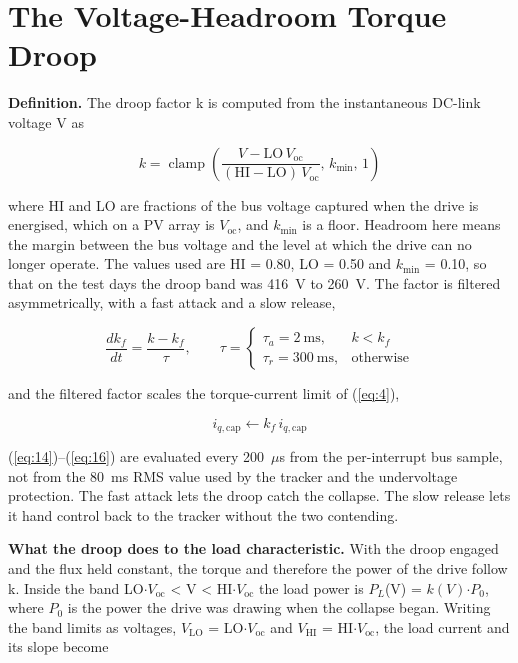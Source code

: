 \documentclass[journal]{IEEEtran}
\begin{document}
\section{The Voltage-Headroom Torque Droop}

\textbf{Definition.} The droop factor k is computed from the instantaneous DC-link voltage V as

\begin{equation}
k = \operatorname{clamp}\!\left(\frac{V - \mathrm{LO}\,V_{\mathrm{oc}}}{(\mathrm{HI}-\mathrm{LO})\,V_{\mathrm{oc}}},\, k_{\min},\, 1\right)
\label{eq:14}
\end{equation}

where HI and LO are fractions of the bus voltage captured when the drive is energised, which on a PV array is $V_{\mathrm{oc}}$, and $k_{\min}$ is a floor. Headroom here means the margin between the bus voltage and the level at which the drive can no longer operate. The values used are HI = 0.80, LO = 0.50 and $k_{\min}$ = 0.10, so that on the test days the droop band was 416~V to 260~V. The factor is filtered asymmetrically, with a fast attack and a slow release,

\begin{equation}
\frac{dk_f}{dt} = \frac{k - k_f}{\tau},\qquad \tau = \begin{cases} \tau_a = 2~\mathrm{ms}, & k < k_f\\ \tau_r = 300~\mathrm{ms}, & \text{otherwise}\end{cases}
\label{eq:15}
\end{equation}

and the filtered factor scales the torque-current limit of (\ref{eq:4}),

\begin{equation}
i_{q,\mathrm{cap}} \leftarrow k_f\, i_{q,\mathrm{cap}}
\label{eq:16}
\end{equation}

(\ref{eq:14})--(\ref{eq:16}) are evaluated every 200~$\mu$s from the per-interrupt bus sample, not from the 80~ms RMS value used by the tracker and the undervoltage protection. The fast attack lets the droop catch the collapse. The slow release lets it hand control back to the tracker without the two contending.

\textbf{What the droop does to the load characteristic.} With the droop engaged and the flux held constant, the torque and therefore the power of the drive follow k. Inside the band LO$\cdot$$V_{\mathrm{oc}}$ < V < HI$\cdot$$V_{\mathrm{oc}}$ the load power is $P_L$(V) = $k(V)$$\cdot$$P_0$, where $P_0$ is the power the drive was drawing when the collapse began. Writing the band limits as voltages, $V_{\mathrm{LO}}$ = LO$\cdot$$V_{\mathrm{oc}}$ and $V_{\mathrm{HI}}$ = HI$\cdot$$V_{\mathrm{oc}}$, the load current and its slope become
\end{document}

